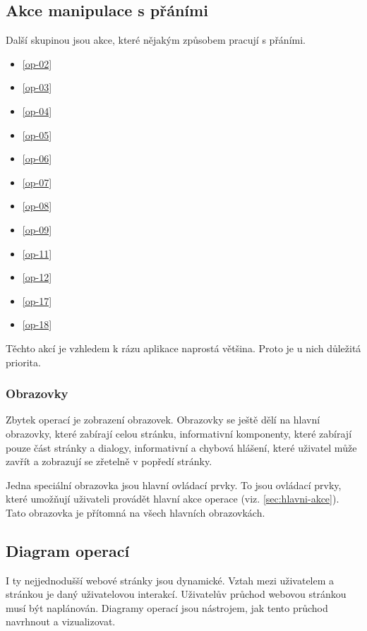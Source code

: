 \subsection{Akce manipulace s přáními}
Další skupinou jsou akce, které nějakým způsobem pracují s přáními.
\begin{multicols}{2}
\begin{itemize}
\item \ref{op-02}
\item \ref{op-03}
\item \ref{op-04}
\item \ref{op-05}
\item \ref{op-06}
\item \ref{op-07}
\item \ref{op-08}
\item \ref{op-09}
\item \ref{op-11}
\item \ref{op-12}
\item \ref{op-17}
\item \ref{op-18}
\end{itemize}
\end{multicols}

Těchto akcí je vzhledem k rázu aplikace naprostá většina. Proto je u nich důležitá priorita.

\subsubsection{Obrazovky}
Zbytek operací je zobrazení obrazovek. Obrazovky se ještě dělí na hlavní obrazovky, které zabírají celou stránku, informativní komponenty, které zabírají pouze část stránky a dialogy, informativní a chybová hlášení, které uživatel může zavřít a zobrazují se zřetelně v popředí stránky.

Jedna speciální obrazovka jsou hlavní ovládací prvky. To jsou ovládací prvky, které umožňují uživateli provádět hlavní akce operace (viz. \ref{sec:hlavni-akce}). Tato obrazovka je přítomná na všech hlavních obrazovkách.

\subsection{Diagram operací}
I ty nejjednodušší webové stránky jsou dynamické. Vztah mezi uživatelem a stránkou je daný uživatelovou interakcí. Uživatelův průchod webovou stránkou musí být naplánován. Diagramy operací jsou nástrojem, jak tento průchod navrhnout a vizualizovat\cite{brown2007communicating}.

